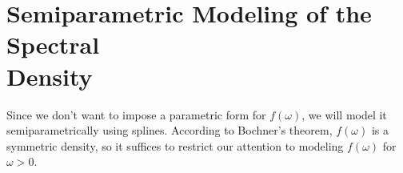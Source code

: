 






















\section{Semiparametric Modeling of the Spectral \\ Density} %
\label{sec:semiparametric_modeling_of_the_spectral_density}

Since we don't want to impose a parametric form for $f(\omega)$, we will model it semiparametrically using splines. According to Bochner's theorem, $f(\omega)$ is a symmetric density, so it suffices to restrict our attention to modeling $f(\omega)$ for $\omega > 0$.

